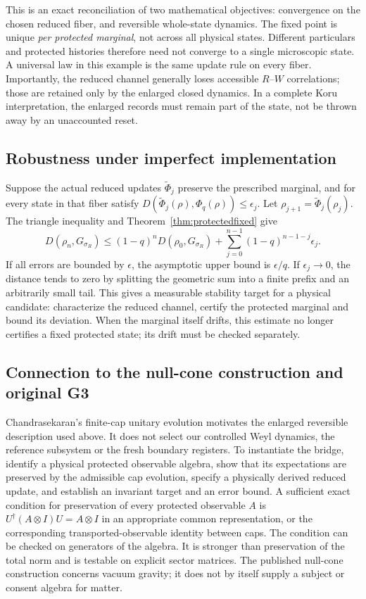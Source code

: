 \documentclass[11pt,a4paper]{article}
\begin{document}
This is an exact reconciliation of two mathematical objectives: convergence on the chosen reduced fiber, and reversible whole-state dynamics. The fixed point is unique \emph{per protected marginal}, not across all physical states. Different particulars and protected histories therefore need not converge to a single microscopic state. A universal law in this example is the same update rule on every fiber. Importantly, the reduced channel generally loses accessible $R$--$W$ correlations; those are retained only by the enlarged closed dynamics. In a complete Koru interpretation, the enlarged records must remain part of the state, not be thrown away by an unaccounted reset.

\subsection{Robustness under imperfect implementation}
Suppose the actual reduced updates $\widetilde\Phi_j$ preserve the prescribed marginal, and for every state in that fiber satisfy $D(\widetilde\Phi_j(\rho),\Phi_q(\rho))\le\epsilon_j$. Let $\rho_{j+1}=\widetilde\Phi_j(\rho_j)$. The triangle inequality and Theorem~\ref{thm:protectedfixed} give
\[
D(\rho_n,G_{\sigma_R})\le(1-q)^n D(\rho_0,G_{\sigma_R})+
\sum_{j=0}^{n-1}(1-q)^{n-1-j}\epsilon_j.
\]
If all errors are bounded by $\epsilon$, the asymptotic upper bound is $\epsilon/q$. If $\epsilon_j\to0$, the distance tends to zero by splitting the geometric sum into a finite prefix and an arbitrarily small tail. This gives a measurable stability target for a physical candidate: characterize the reduced channel, certify the protected marginal and bound its deviation. When the marginal itself drifts, this estimate no longer certifies a fixed protected state; its drift must be checked separately.

\subsection{Connection to the null-cone construction and original G3}
Chandrasekaran's finite-cap unitary evolution motivates the enlarged reversible description used above. It does not select our controlled Weyl dynamics, the reference subsystem or the fresh boundary registers. To instantiate the bridge, identify a physical protected observable algebra, show that its expectations are preserved by the admissible cap evolution, specify a physically derived reduced update, and establish an invariant target and an error bound. A sufficient exact condition for preservation of every protected observable $A$ is $U^\dagger(A\otimes I)U=A\otimes I$ in an appropriate common representation, or the corresponding transported-observable identity between caps. The condition can be checked on generators of the algebra. It is stronger than preservation of the total norm and is testable on explicit sector matrices. The published null-cone construction concerns vacuum gravity; it does not by itself supply a subject or consent algebra for matter.
\end{document}

